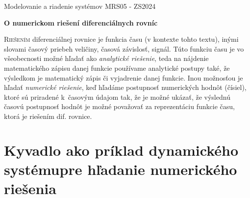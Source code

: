 \documentclass[a4paper, 10pt, ]{article}
\def\oznacenieCasti{MRS05 - ZS2024}
\begin{document}
\lstset{%
style=mystyle,
rangebeginprefix=\#\#\#\ cellB\ ,%
rangebeginsuffix=\ \#\#\#,%
rangeendprefix=\#\#\#\ cellE\ ,%
rangeendsuffix=\ \#\#\#,%
includerangemarker=false,
}





\fontsize{12pt}{22pt}\selectfont

\centerline{\textsf{Modelovanie a riadenie systémov} \hfill \textsf{\oznacenieCasti}}

\fontsize{18pt}{22pt}\selectfont





\begin{flushleft}
	\textbf{\textsf{O numerickom riešení diferenciálnych rovníc}}
\end{flushleft}





\normalsize

\bigskip

{\hypersetup{hidelinks}

\tableofcontents

}

\bigskip

\vspace{18pt}



\noindent
\lettrine[lines=3, nindent=0pt]{R}{iešením} diferenciálnej rovnice je funkcia času (v kontexte tohto textu), inými slovami časový priebeh veličiny, časová závislosť, signál. Túto funkciu času je vo všeobecnosti možné hľadať ako \emph{analytické riešenie}, teda na nájdenie matematického zápisu danej funkcie používame analytické postupy také, že výsledkom je matematický zápis či vyjadrenie danej funkcie. Inou možnosťou je hľadať \emph{numerické riešenie}, keď hľadáme postupnosť numerických hodnôt (čísiel), ktoré sú priradené k~časovým údajom tak, že je možné ukázať, že výslednú časovú postupnosť hodnôt je možné považovať za reprezentáciu funkcie času, ktorá je riešením dif. rovnice.







\section{Kyvadlo ako príklad dynamického systému\newline pre hľadanie numerického riešenia}
\end{document}
